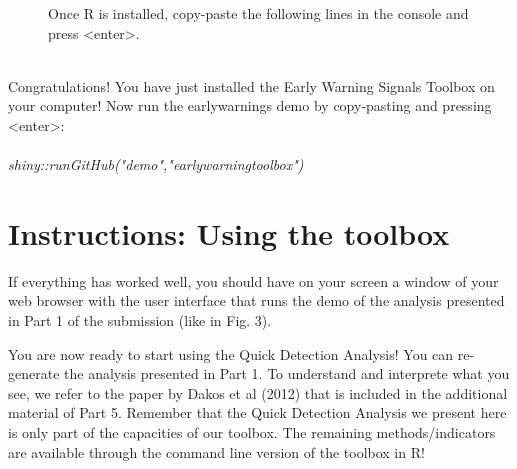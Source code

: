 \documentclass[12pt,a4paper,final]{article}
\begin{document}
\begin{doublespacing}
\begin{figure}[ht]
\begin{center}
\caption{Once R is installed, copy-paste the following lines in the console and press <enter>.}
\end{center}
\end{figure}
\\
Congratulations! You have just installed the Early Warning Signals Toolbox on your computer! Now run the earlywarnings demo by copy-pasting and pressing <enter>:\\
\\
\textit{shiny::runGitHub("demo","earlywarningtoolbox")}

\section{Instructions: Using the toolbox}
If everything has worked well, you should have on your screen a window of your web browser with the user interface that runs the demo of the analysis presented in Part 1 of the submission (like in Fig. 3).%


You are now ready to start using the Quick Detection Analysis! You can re-generate the analysis presented in Part 1. To understand and interprete what you see, we refer to the paper by Dakos et al (2012) that is included in the additional material of Part 5. Remember that the Quick Detection Analysis we present here is only part of the capacities of our toolbox. The remaining methods/indicators are available through the command line version of the toolbox in R!


\end{doublespacing}
\end{document}
